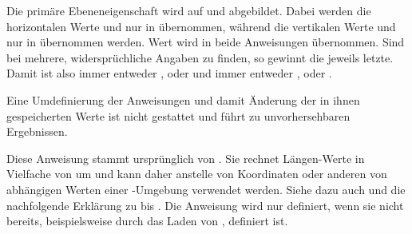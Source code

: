 Die primäre Ebeneneigenschaft  wird auf
 und
 abgebildet. Dabei werden die horizontalen Werte 
und  nur in  übernommen, während die vertikalen
Werte  und  nur in  übernommen
werden. %
Wert  wird in
beide Anweisungen übernommen. Sind bei  mehrere,
widersprüchliche Angaben zu finden, so gewinnt die jeweils letzte. Damit ist
also  immer entweder ,  oder 
und  immer entweder ,  oder .

Eine Umdefinierung der Anweisungen und damit Änderung der in
ihnen gespeicherten Werte ist nicht gestattet und führt zu unvorhersehbaren
Ergebnissen.%
\EndIndexGroup


\begin{Declaration}
\end{Declaration}
Diese Anweisung stammt ursprünglich von
. Sie rechnet Längen-Werte in Vielfache von  um und kann
daher anstelle von Koordinaten oder anderen von  abhängigen
Werten einer -Umgebung verwendet werden. Siehe dazu auch
\cite{package:eso-pic} und die nachfolgende Erklärung zu
 bis . Die
Anweisung wird nur definiert, wenn sie nicht bereits, beispielsweise durch das
Laden von , definiert ist.%
\iffalse%
\par
Es sei an dieser Stelle darauf hingewiesen, dass man bei Verwendung von Paket
\Package{picture}\IndexPackage{picture}\important{\Package{picture}} (siehe
\cite{package:picture}) die Anweisung \Macro{LenToUnit} in der Regel nicht
mehr benötigt. Das Paket erweitert die \Environment{picture}-Umgebung und
deren Anweisung so, dass man für Koordinaten auch direkt \LaTeX-Längen
verwenden kann.%
\fi
\EndIndexGroup


